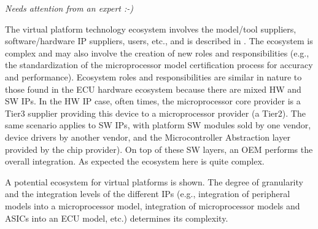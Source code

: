 \emph{Needs attention from an expert :-)}

The virtual platform technology ecosystem involves the model/tool suppliers, software/hardware IP suppliers, users, etc., and is described in \cite{Knauss2014d}.  The ecosystem is complex and may also involve the creation of new roles and responsibilities (e.g., the standardization of the microprocessor model certification process  for accuracy and performance). Ecosystem roles and responsibilities are similar in nature to those found in the ECU hardware ecosystem because there are mixed HW and SW IPs. In the HW IP case, often times, the microprocessor core provider is a Tier3 supplier providing this device to a microprocessor provider (a Tier2). The same scenario applies to SW IPs, with platform SW modules sold by one vendor, device drivers by another vendor, and the Microcontroller Abstraction layer provided by the chip provider). On top of these SW layers, an OEM performs the overall integration. As expected the ecosystem here is quite complex.

A potential ecosystem for virtual platforms is shown. %
The degree of granularity and the integration levels of the different IPs (e.g., integration of peripheral models into a microprocessor model, integration of microprocessor models and ASICs into an ECU model, etc.) determines its complexity.
